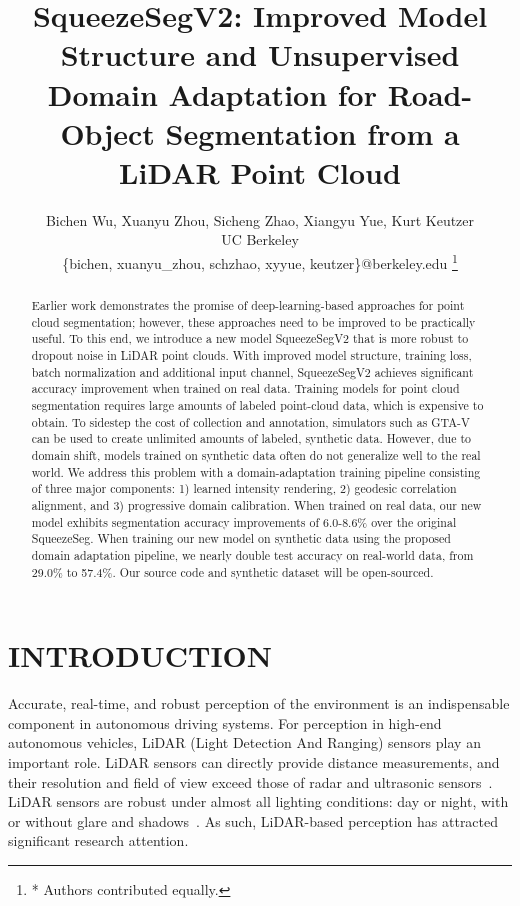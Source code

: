 \documentclass[letterpaper, 10 pt, conference]{ieeeconf}
\title{\LARGE \bf
SqueezeSegV2: Improved Model Structure and Unsupervised Domain Adaptation for Road-Object Segmentation from a LiDAR Point Cloud
}
\author{Bichen Wu, Xuanyu Zhou, Sicheng Zhao, Xiangyu Yue, Kurt Keutzer \\
UC Berkeley \\
\{bichen, xuanyu\_zhou, schzhao, xyyue, keutzer\}@berkeley.edu
\thanks{* Authors contributed equally.}
}
\begin{document}
\maketitle
\thispagestyle{empty}
\pagestyle{empty}

\begin{abstract}
 Earlier work demonstrates the promise of deep-learning-based approaches for point cloud segmentation; however, these approaches need to be improved to be practically useful. To this end, we introduce a new model SqueezeSegV2 that is more robust to dropout noise in LiDAR point clouds. With improved model structure, training loss, batch normalization and additional input channel, SqueezeSegV2 achieves significant accuracy improvement when trained on real data. Training models for point cloud segmentation requires large amounts of labeled  point-cloud data, which is expensive to obtain. To sidestep the cost of collection and annotation, simulators such as GTA-V can be used to create unlimited amounts of labeled, synthetic data. However, due to domain shift, models trained on synthetic data often do not generalize well to the real world. We address this problem with a domain-adaptation training pipeline consisting of three major  components:  1) learned intensity rendering, 2) geodesic  correlation alignment, and 3) progressive domain calibration. When trained on real data, our new model exhibits segmentation accuracy improvements of 6.0-8.6\% over the original SqueezeSeg. When training our new model on synthetic data using the proposed domain adaptation pipeline, we nearly double test accuracy on real-world data, from 29.0\% to 57.4\%. Our source code and synthetic dataset will  be  open-sourced.
\end{abstract}
\section{INTRODUCTION}
\label{sec:Introduction}
Accurate, real-time, and robust perception of the environment is an indispensable component in autonomous driving systems. For perception in high-end autonomous vehicles, LiDAR (Light Detection And Ranging) sensors play an important role. LiDAR sensors can directly provide distance measurements, and their resolution and field of view exceed those of radar and ultrasonic sensors~\cite{moosmann2009segmentation}. LiDAR sensors are robust under almost all lighting conditions: day or night, with or without glare and shadows~\cite{wu2017squeezeseg}. As such, LiDAR-based perception has attracted significant research attention.
\end{document}
